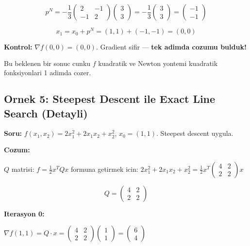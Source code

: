 \documentclass[12pt,a4paper]{article}
\theoremstyle{definition}
\theoremstyle{remark}
\begin{document}
\[
p^N = -\frac{1}{3} \begin{pmatrix} 2 & -1 \\ -1 & 2 \end{pmatrix} \begin{pmatrix} 3 \\ 3 \end{pmatrix} = -\frac{1}{3} \begin{pmatrix} 3 \\ 3 \end{pmatrix} = \begin{pmatrix} -1 \\ -1 \end{pmatrix}
\]

\[
x_1 = x_0 + p^N = (1,1) + (-1,-1) = (0, 0)
\]

\textbf{Kontrol:} $\nabla f(0,0) = (0, 0)$. Gradient sifir --- \textbf{tek adimda cozumu bulduk!}

Bu beklenen bir sonuc cunku $f$ kuadratik ve Newton yontemi kuadratik fonksiyonlari 1 adimda cozer.

\subsection{Ornek 5: Steepest Descent ile Exact Line Search (Detayli)}

\textbf{Soru:} $f(x_1, x_2) = 2x_1^2 + 2x_1 x_2 + x_2^2$, $x_0 = (1, 1)$. Steepest descent uygula.

\bigskip
\textbf{Cozum:}

$Q$ matrisi: $f = \frac{1}{2}x^T Q x$ formuna getirmek icin: $2x_1^2 + 2x_1 x_2 + x_2^2 = \frac{1}{2}x^T \begin{pmatrix} 4 & 2 \\ 2 & 2 \end{pmatrix} x$

\[
Q = \begin{pmatrix} 4 & 2 \\ 2 & 2 \end{pmatrix}
\]

\textbf{Iterasyon 0:}

$\nabla f(1,1) = Q \cdot x = \begin{pmatrix} 4 & 2 \\ 2 & 2 \end{pmatrix} \begin{pmatrix} 1 \\ 1 \end{pmatrix} = \begin{pmatrix} 6 \\ 4 \end{pmatrix}$
\end{document}
